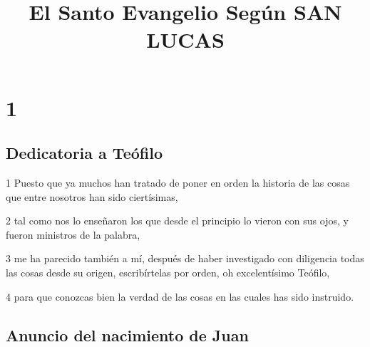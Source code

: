 
\title{El Santo Evangelio Según SAN LUCAS}

\chapter{1}

\section*{Dedicatoria a Teófilo}

\par 1 Puesto que ya muchos han tratado de poner en orden la historia de las cosas que entre nosotros han sido ciertísimas,
\par 2 tal como nos lo enseñaron los que desde el principio lo vieron con sus ojos, y fueron ministros de la palabra,
\par 3 me ha parecido también a mí, después de haber investigado con diligencia todas las cosas desde su origen, escribírtelas por orden, oh excelentísimo Teófilo,
\par 4 para que conozcas bien la verdad de las cosas en las cuales has sido instruido.

\section*{Anuncio del nacimiento de Juan}

